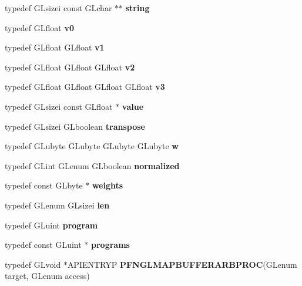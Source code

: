 \begin{DoxyCompactItemize}
\item 
typedef G\+Lsizei const G\+Lchar $\ast$$\ast$ {\bfseries string}\label{_s_d_l__opengl_8h_ae9ea2d206f76ea82db7a2ea002fdef2f}

\item 
typedef G\+Lfloat {\bfseries v0}\label{_s_d_l__opengl_8h_a8f5597b6002609ead33af221dcf29790}

\item 
typedef G\+Lfloat G\+Lfloat {\bfseries v1}\label{_s_d_l__opengl_8h_a435c176a02c061b43e19bdf7c86cceae}

\item 
typedef G\+Lfloat G\+Lfloat G\+Lfloat {\bfseries v2}\label{_s_d_l__opengl_8h_a0928f6d0f0f794ba000a21dfae422136}

\item 
typedef G\+Lfloat G\+Lfloat G\+Lfloat G\+Lfloat {\bfseries v3}\label{_s_d_l__opengl_8h_aa227f3298f83f4d646cc0fbe38dfbbed}

\item 
typedef G\+Lsizei const G\+Lfloat $\ast$ {\bfseries value}\label{_s_d_l__opengl_8h_a6a4f8a1a444e9080b297963b3db29fe0}

\item 
typedef G\+Lsizei G\+Lboolean {\bfseries transpose}\label{_s_d_l__opengl_8h_abddae8e27995e1aa57df4d93edd33803}

\item 
typedef G\+Lubyte G\+Lubyte G\+Lubyte G\+Lubyte {\bfseries w}\label{_s_d_l__opengl_8h_ad47d000a8e40b26a33682e10ae32a1b6}

\item 
typedef G\+Lint G\+Lenum G\+Lboolean {\bfseries normalized}\label{_s_d_l__opengl_8h_a991495bc19f64c176dd83a350b8b1c88}

\item 
typedef const G\+Lbyte $\ast$ {\bfseries weights}\label{_s_d_l__opengl_8h_a3fc6a10c8f7ffa12a6a7855d06ff581d}

\item 
typedef G\+Lenum G\+Lsizei {\bfseries len}\label{_s_d_l__opengl_8h_a508cd9b0e54f044f23b7fc474233693b}

\item 
typedef G\+Luint {\bfseries program}\label{_s_d_l__opengl_8h_ab55c179cd6c84b3f5ddc11d9da0f55b4}

\item 
typedef const G\+Luint $\ast$ {\bfseries programs}\label{_s_d_l__opengl_8h_a36b28b34166ce7bfd72fe771441526a7}

\item 
typedef G\+Lvoid $\ast$A\+P\+I\+E\+N\+T\+R\+Y\+P {\bfseries P\+F\+N\+G\+L\+M\+A\+P\+B\+U\+F\+F\+E\+R\+A\+R\+B\+P\+R\+O\+C}(G\+Lenum target, G\+Lenum access)\label{_s_d_l__opengl_8h_a7c047f4b3f2d64e3c9db43ff8dc5ddbf}


\end{DoxyCompactItemize}
